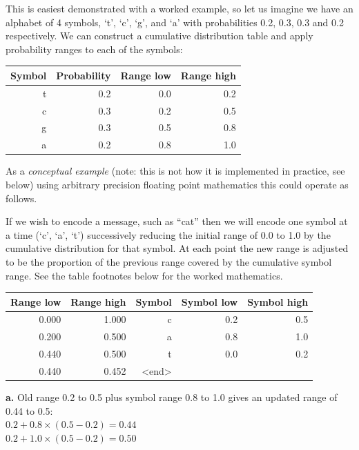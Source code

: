 \documentclass[a4paper]{article}
\begin{document}
This is easiest demonstrated with a worked example, so let us imagine
we have an alphabet of 4 symbols, `t', `c', `g', and `a' with
probabilities 0.2, 0.3, 0.3 and 0.2 respectively.  We can construct a
cumulative distribution table and apply probability ranges to each of
the symbols:

\begin{tabular}{rrrr}
\hline
\textbf{Symbol} & \textbf{Probability} & \textbf{Range low} & \textbf{Range high}\\
\hline
t & 0.2 & 0.0 & 0.2 \\
c & 0.3 & 0.2 & 0.5 \\
g & 0.3 & 0.5 & 0.8 \\
a & 0.2 & 0.8 & 1.0 \\
\hline
\end{tabular}

As a \emph{conceptual example} (note: this is not how it is implemented in practice, see below) using arbitrary precision floating point mathematics this could operate as follows.

If we wish to encode a message, such as ``cat'' then we will encode
one symbol at a time (`c', `a', `t') successively reducing the
initial range of 0.0 to 1.0 by the cumulative distribution for that
symbol.  At each point the new range is adjusted to be the proportion
of the previous range covered by the cumulative symbol range.  See the
table footnotes below for the worked mathematics.

\begin{threeparttable}[t]
\begin{tabular}{rrrrr}
\hline
\textbf{Range low} & \textbf{Range high} & \textbf{Symbol} & \textbf{Symbol low} & \textbf{Symbol high}\\
\hline
0.000 & 1.000 & c & 0.2 & 0.5\\
0.200 & 0.500 & a & 0.8 & 1.0\\
0.440\tnote{\textbf{a}} & 0.500\tnote{\textbf{a}} & t & 0.0 & 0.2\\
0.440 & 0.452 & <end>\\
\hline
\end{tabular}
\begin{tablenotes}
\item{\textbf{a.}} Old range 0.2 to 0.5 plus symbol range 0.8 to 1.0 gives an updated range of 0.44 to 0.5:\\
 $0.2 + 0.8\times(0.5-0.2) = 0.44$\\
$0.2 + 1.0\times(0.5-0.2) = 0.50$
\end{tablenotes}
\end{threeparttable}
\end{document}
